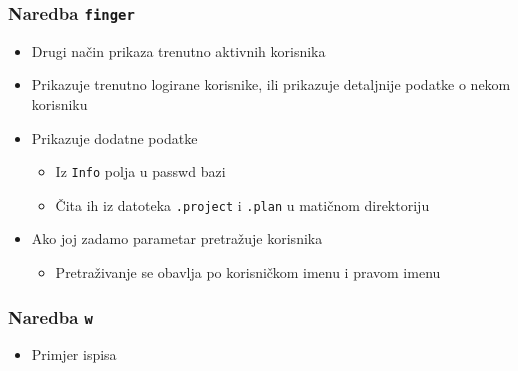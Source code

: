 \documentclass[table,usenames,dvipsnames] {beamer}
\newcommand{\shell}[1]{\texttt{#1}}
\begin{document}
\begin{frame}[t]
\frametitle{Naredba \shell{finger}}
\begin{itemize}
  \item Drugi način prikaza trenutno aktivnih korisnika
  \item Prikazuje trenutno logirane korisnike, ili prikazuje 
          detaljnije podatke o nekom korisniku
\end{itemize}
\begin{itemize}
   \item Prikazuje dodatne podatke
   \begin{itemize}
   	\item Iz \shell{Info} polja u passwd bazi
   	\item Čita ih iz datoteka \shell{.project} i \shell{.plan} u matičnom direktoriju
   \end{itemize}
   \item Ako joj zadamo parametar pretražuje korisnika
   \begin{itemize}
   	\item Pretraživanje se obavlja po korisničkom imenu i pravom imenu
   \end{itemize}
\end{itemize}
\end{frame}

\begin{frame}[t]
\frametitle{Naredba \shell{w}}
\begin{itemize}
  \item Primjer ispisa
    \begin{table}[h]\footnotesize
    \end{table}
\end{itemize}
\end{frame}
\end{document}
